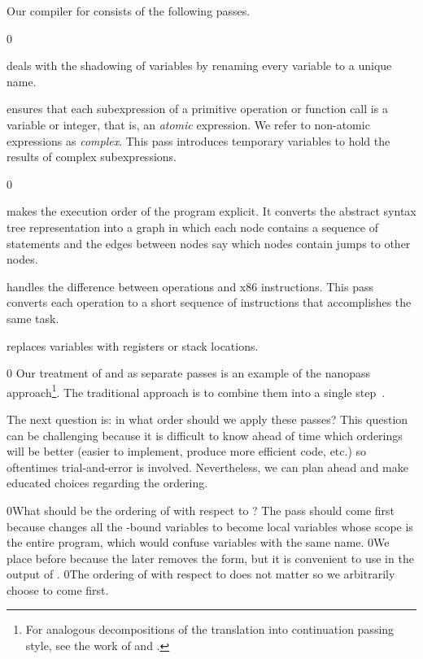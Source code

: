 \documentclass[7x10,nocrop]{TimesAPriori_MIT}%
\def\racketEd{0}
\def\edition{0}
\newcommand{\racket}[1]{{\if\edition\racketEd{#1}\fi}}
\begin{document}
Our compiler for \LangVar{} consists of the following passes.
%
\begin{description}
{\if\edition\racketEd
\item[\key{uniquify}] deals with the shadowing of variables by
  renaming every variable to a unique name.
  \fi}

\item[\key{remove\_complex\_operands}] ensures that each subexpression
  of a primitive operation or function call is a variable or integer,
  that is, an \emph{atomic} expression. We refer to non-atomic
  expressions as \emph{complex}.  This pass introduces temporary
  variables to hold the results of complex
  subexpressions.%
  
{\if\edition\racketEd
\item[\key{explicate\_control}] makes the execution order of the
  program explicit. It converts the abstract syntax tree
  representation into a graph in which each node contains a sequence
  of statements and the edges between nodes say which nodes contain
  jumps to other nodes.
\fi}

\item[\key{select\_instructions}] handles the difference between
  \LangVar{} operations and x86 instructions. This pass converts each
  \LangVar{} operation to a short sequence of instructions that
  accomplishes the same task.

\item[\key{assign\_homes}] replaces variables with registers or stack
  locations.
\end{description}
%
{\if\edition\racketEd
%
Our treatment of  and
 as separate passes is an example of the
nanopass approach\footnote{For analogous decompositions of the
  translation into continuation passing style, see the work of
  \citet{Lawall:1993} and \citet{Hatcliff:1994ea}.}.  The traditional
approach is to combine them into a single step~\citep{Aho:2006wb}.
%  
\fi}

The next question is: in what order should we apply these passes? This
question can be challenging because it is difficult to know ahead of
time which orderings will be better (easier to implement, produce more
efficient code, etc.) so oftentimes trial-and-error is
involved. Nevertheless, we can plan ahead and make educated choices
regarding the ordering.

\racket{What should be the ordering of  with respect to
\key{uniquify}? The \key{uniquify} pass should come first because
\key{explicate\_control} changes all the \key{let}-bound variables to
become local variables whose scope is the entire program, which would
confuse variables with the same name.}
%
\racket{We place  before \key{explicate\_control}
because the later removes the \key{let} form, but it is convenient to
use \key{let} in the output of .}
%
\racket{The ordering of  with respect to
\key{remove\_complex\_operands} does not matter so we arbitrarily choose
\key{uniquify} to come first.}
\end{document}
